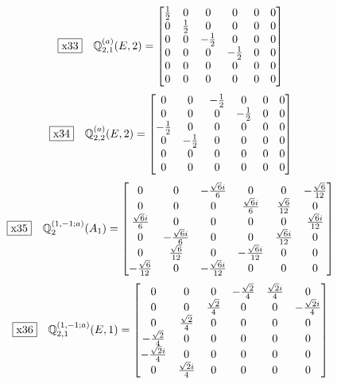 \documentclass[fleqn,10pt,landscape]{jsarticle}
\begin{document}
\begin{dmath*}
\fbox{x33}\quad \mathbb{Q}_{2,1}^{(a)}(E,2)=\begin{bmatrix} \frac{1}{2} & 0 & 0 & 0 & 0 & 0 \\ 0 & \frac{1}{2} & 0 & 0 & 0 & 0 \\ 0 & 0 & - \frac{1}{2} & 0 & 0 & 0 \\ 0 & 0 & 0 & - \frac{1}{2} & 0 & 0 \\ 0 & 0 & 0 & 0 & 0 & 0 \\ 0 & 0 & 0 & 0 & 0 & 0 \end{bmatrix}
\end{dmath*}
\begin{dmath*}
\fbox{x34}\quad \mathbb{Q}_{2,2}^{(a)}(E,2)=\begin{bmatrix} 0 & 0 & - \frac{1}{2} & 0 & 0 & 0 \\ 0 & 0 & 0 & - \frac{1}{2} & 0 & 0 \\ - \frac{1}{2} & 0 & 0 & 0 & 0 & 0 \\ 0 & - \frac{1}{2} & 0 & 0 & 0 & 0 \\ 0 & 0 & 0 & 0 & 0 & 0 \\ 0 & 0 & 0 & 0 & 0 & 0 \end{bmatrix}
\end{dmath*}
\begin{dmath*}
\fbox{x35}\quad \mathbb{Q}_{2}^{(1,-1;a)}(A_{1})=\begin{bmatrix} 0 & 0 & - \frac{\sqrt{6} i}{6} & 0 & 0 & - \frac{\sqrt{6}}{12} \\ 0 & 0 & 0 & \frac{\sqrt{6} i}{6} & \frac{\sqrt{6}}{12} & 0 \\ \frac{\sqrt{6} i}{6} & 0 & 0 & 0 & 0 & \frac{\sqrt{6} i}{12} \\ 0 & - \frac{\sqrt{6} i}{6} & 0 & 0 & \frac{\sqrt{6} i}{12} & 0 \\ 0 & \frac{\sqrt{6}}{12} & 0 & - \frac{\sqrt{6} i}{12} & 0 & 0 \\ - \frac{\sqrt{6}}{12} & 0 & - \frac{\sqrt{6} i}{12} & 0 & 0 & 0 \end{bmatrix}
\end{dmath*}
\begin{dmath*}
\fbox{x36}\quad \mathbb{Q}_{2,1}^{(1,-1;a)}(E,1)=\begin{bmatrix} 0 & 0 & 0 & - \frac{\sqrt{2}}{4} & \frac{\sqrt{2} i}{4} & 0 \\ 0 & 0 & \frac{\sqrt{2}}{4} & 0 & 0 & - \frac{\sqrt{2} i}{4} \\ 0 & \frac{\sqrt{2}}{4} & 0 & 0 & 0 & 0 \\ - \frac{\sqrt{2}}{4} & 0 & 0 & 0 & 0 & 0 \\ - \frac{\sqrt{2} i}{4} & 0 & 0 & 0 & 0 & 0 \\ 0 & \frac{\sqrt{2} i}{4} & 0 & 0 & 0 & 0 \end{bmatrix}
\end{dmath*}
\end{document}
